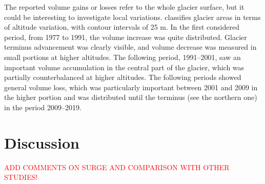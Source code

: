 {{The reported volume gains or losses refer to the whole glacier surface, but it could be interesting to investigate local variations. 
 classifies glacier areas in terms of altitude variation, with contour intervals of 25 m. 
In the first considered period, from 1977 to 1991, the volume increase was quite distributed. 
Glacier terminus advancement was clearly visible, and volume decrease was measured in small portions at higher altitudes. 
The following period, 1991–2001, saw an important volume accumulation in the central part of the glacier, which was partially counterbalanced at higher altitudes. 
The following periods showed general volume loss, which was particularly important between 2001 and 2009 in the higher portion and was distributed until the terminus (see the northern one) in the period 2009–2019.

\section{Discussion}\label{sec:2:discussion}

\textcolor{red}{ADD COMMENTS ON SURGE AND COMPARISON WITH OTHER STUDIES!}

}}
